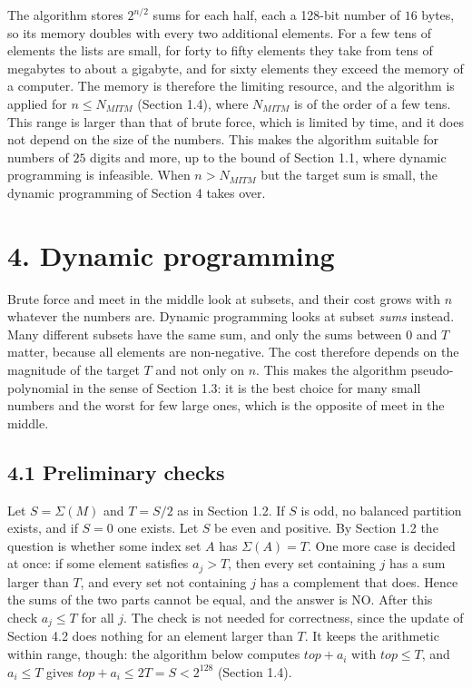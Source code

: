 \documentclass[
]{article}
\begin{document}
The algorithm stores \(2^{n/2}\) sums for each half, each a 128-bit
number of \(16\) bytes, so its memory doubles with every two additional
elements. For a few tens of elements the lists are small, for forty to
fifty elements they take from tens of megabytes to about a gigabyte, and
for sixty elements they exceed the memory of a computer. The memory is
therefore the limiting resource, and the algorithm is applied for
\(n \le N_{MITM}\) (Section 1.4), where \(N_{MITM}\) is of the order of
a few tens. This range is larger than that of brute force, which is
limited by time, and it does not depend on the size of the numbers. This
makes the algorithm suitable for numbers of \(25\) digits and more, up
to the bound of Section 1.1, where dynamic programming is infeasible.
When \(n > N_{MITM}\) but the target sum is small, the dynamic
programming of Section 4 takes over.

\hypertarget{dynamic-programming}{%
\section{4. Dynamic programming}\label{dynamic-programming}}

Brute force and meet in the middle look at subsets, and their cost grows
with \(n\) whatever the numbers are. Dynamic programming looks at subset
\emph{sums} instead. Many different subsets have the same sum, and only
the sums between \(0\) and \(T\) matter, because all elements are
non-negative. The cost therefore depends on the magnitude of the target
\(T\) and not only on \(n\). This makes the algorithm pseudo-polynomial
in the sense of Section 1.3: it is the best choice for many small
numbers and the worst for few large ones, which is the opposite of meet
in the middle.

\hypertarget{preliminary-checks}{%
\subsection{4.1 Preliminary checks}\label{preliminary-checks}}

Let \(S = \Sigma(M)\) and \(T = S/2\) as in Section 1.2. If \(S\) is
odd, no balanced partition exists, and if \(S = 0\) one exists. Let
\(S\) be even and positive. By Section 1.2 the question is whether some
index set \(A\) has \(\Sigma(A) = T\). One more case is decided at once:
if some element satisfies \(a_j > T\), then every set containing \(j\)
has a sum larger than \(T\), and every set not containing \(j\) has a
complement that does. Hence the sums of the two parts cannot be equal,
and the answer is NO. After this check \(a_j \le T\) for all \(j\). The
check is not needed for correctness, since the update of Section 4.2
does nothing for an element larger than \(T\). It keeps the arithmetic
within range, though: the algorithm below computes \(top + a_i\) with
\(top \le T\), and \(a_i \le T\) gives
\(top + a_i \le 2T = S < 2^{128}\) (Section 1.4).
\end{document}
